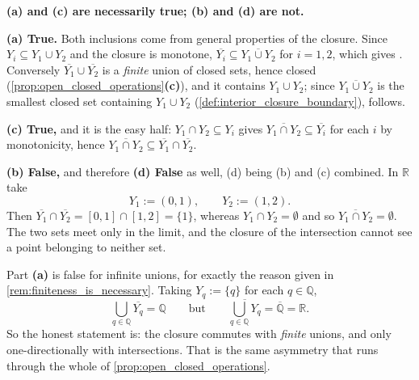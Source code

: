
\begin{exercisesolution}
\label{sol:closure_multiple_choice}
\textbf{(a) and (c) are necessarily true; (b) and (d) are not.}

\textbf{(a) True.} Both inclusions come from general properties of the closure. Since
$Y_i \subseteq Y_1 \cup Y_2$ and the closure is monotone,
$\overline{Y_i} \subseteq \overline{Y_1\cup Y_2}$ for $i=1,2$, which gives \qt{$\supseteq$}.
Conversely $\overline{Y_1}\cup\overline{Y_2}$ is a \emph{finite} union of closed sets, hence
closed (\cref{prop:open_closed_operations}\textbf{(c)}), and it contains $Y_1\cup Y_2$; since
$\overline{Y_1\cup Y_2}$ is the smallest closed set containing $Y_1 \cup Y_2$
(\cref{def:interior_closure_boundary}), \qt{$\subseteq$} follows.

\textbf{(c) True,} and it is the easy half: $Y_1\cap Y_2 \subseteq Y_i$ gives
$\overline{Y_1\cap Y_2} \subseteq \overline{Y_i}$ for each $i$ by monotonicity, hence
$\overline{Y_1\cap Y_2} \subseteq \overline{Y_1}\cap\overline{Y_2}$.

\textbf{(b) False,} and therefore \textbf{(d) False} as well, (d) being (b) and (c) combined. In
$\mathbb{R}$ take
\[Y_1 := (0,1), \qquad Y_2 := (1,2).\]
Then $\overline{Y_1}\cap\overline{Y_2} = [0,1]\cap[1,2] = \{1\}$, whereas
$Y_1\cap Y_2 = \emptyset$ and so $\overline{Y_1\cap Y_2} = \emptyset$. The two sets meet only in
the limit, and the closure of the intersection cannot see a point belonging to neither set.

\begin{remark}
Part \textbf{(a)} is false for infinite unions, for exactly the reason given in
\cref{rem:finiteness_is_necessary}. Taking $Y_q := \{q\}$ for each $q \in \mathbb{Q}$,
\[\bigcup_{q\in\mathbb{Q}}\overline{Y_q} = \mathbb{Q}
  \qquad\text{but}\qquad
  \overline{\bigcup_{q\in\mathbb{Q}}Y_q} = \overline{\mathbb{Q}} = \mathbb{R}.\]
So the honest statement is: the closure commutes with \emph{finite} unions, and only
one-directionally with intersections. That is the same asymmetry that runs through the whole of
\cref{prop:open_closed_operations}.
\end{remark}
\end{exercisesolution}

